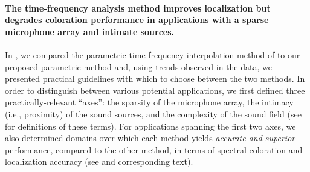 \paragraph{The time-frequency analysis method improves localization but degrades coloration performance in applications with a sparse microphone array and intimate sources.}
In , we compared the parametric time-frequency interpolation method of \citet{Thiergart2013} to our proposed parametric method and, using trends observed in the data, we presented practical guidelines with which to choose between the two methods.
In order to distinguish between various potential applications, we first defined three practically-relevant ``axes'': the sparsity of the microphone array, the intimacy (i.e., proximity) of the sound sources, and the complexity of the sound field (see  for definitions of these terms).
For applications spanning the first two axes, we also determined domains over which each method yields \textit{accurate and superior} performance, compared to the other method, in terms of spectral coloration and localization accuracy (see  and corresponding text).

